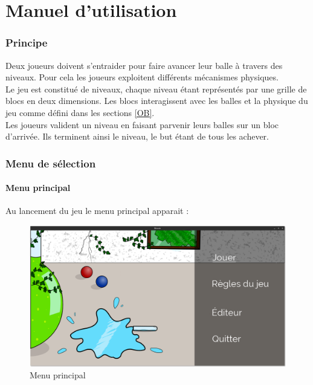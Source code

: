 \chapter{Manuel d'utilisation}

\subsection {Principe}
Deux joueurs doivent s'entraider pour faire avancer leur balle à travers
des niveaux. Pour cela les joueurs exploitent différents mécanismes
physiques.
\\

Le jeu est constitué de niveaux, chaque niveau
étant représentés par une grille de blocs en deux dimensions. Les blocs interagissent
avec les balles et la physique du jeu comme défini dans les sections \ref{OB}.
\\

Les joueurs valident un niveau en faisant parvenir leurs
balles sur un bloc d'arrivée. Ils terminent ainsi le niveau, le but étant de tous
les achever.

\subsection {Menu de sélection}

\subsubsection{Menu principal}

Au lancement du jeu le menu principal apparait :


\begin{figure} [h]
    \centerline {\includegraphics[width=13cm]{figures/menu_principale.png}}
    \caption {Menu principal}
    \label {fig:MP}
\end{figure}

